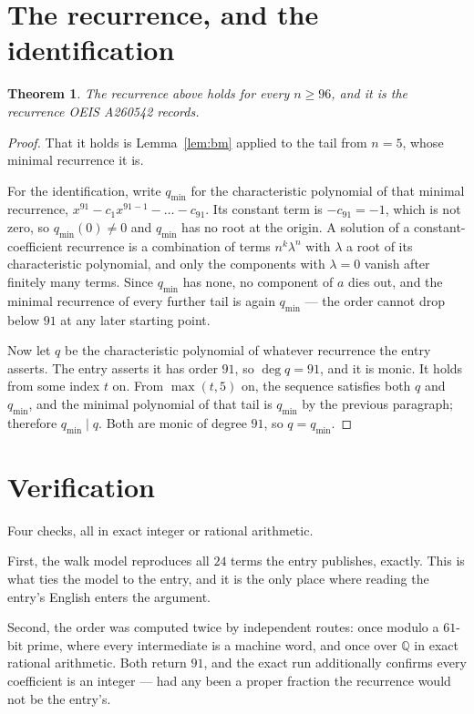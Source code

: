 \documentclass[11pt,a4paper]{article}
\theoremstyle{plain}
\newtheorem{theorem}{Theorem}
\theoremstyle{definition}
\begin{document}
\section{The recurrence, and the identification}

\begin{theorem}
The recurrence above holds for every $n\ge96$, and it is the recurrence OEIS A260542 records.
\end{theorem}

\begin{proof}
That it holds is Lemma~\ref{lem:bm} applied to the tail from $n=5$, whose minimal
recurrence it is.

For the identification, write $q_{\min}$ for the characteristic polynomial of that minimal
recurrence, $x^{91}-c_1x^{91-1}-\dots-c_{91}$. Its constant term is
$-c_{91}=-1$, which is not zero, so $q_{\min}(0)\neq0$ and $q_{\min}$ has no
root at the origin. A solution of a constant-coefficient recurrence is a combination of terms
$n^{k}\lambda^{n}$ with $\lambda$ a root of its characteristic polynomial, and only the
components with $\lambda=0$ vanish after finitely many terms. Since $q_{\min}$ has none, no
component of $a$ dies out, and the minimal recurrence of every further tail is again
$q_{\min}$ --- the order cannot drop below $91$ at any later starting point.

Now let $q$ be the characteristic polynomial of whatever recurrence the entry asserts. The
entry asserts it has order $91$, so $\deg q=91$, and it is monic. It holds from some
index $t$ on. From $\max(t,5)$ on, the sequence satisfies both $q$ and $q_{\min}$, and
the minimal polynomial of that tail is $q_{\min}$ by the previous paragraph; therefore
$q_{\min}\mid q$. Both are monic of degree $91$, so $q=q_{\min}$.
\end{proof}

\section{Verification}

Four checks, all in exact integer or rational arithmetic.

First, the walk model reproduces all $24$ terms the entry publishes, exactly. This is
what ties the model to the entry, and it is the only place where reading the entry's English
enters the argument.

Second, the order was computed twice by independent routes: once modulo a $61$-bit prime, where
every intermediate is a machine word, and once over $\mathbb{Q}$ in exact rational arithmetic.
Both return $91$, and the exact run additionally confirms every coefficient is an integer
--- had any been a proper fraction the recurrence would not be the entry's.
\end{document}
